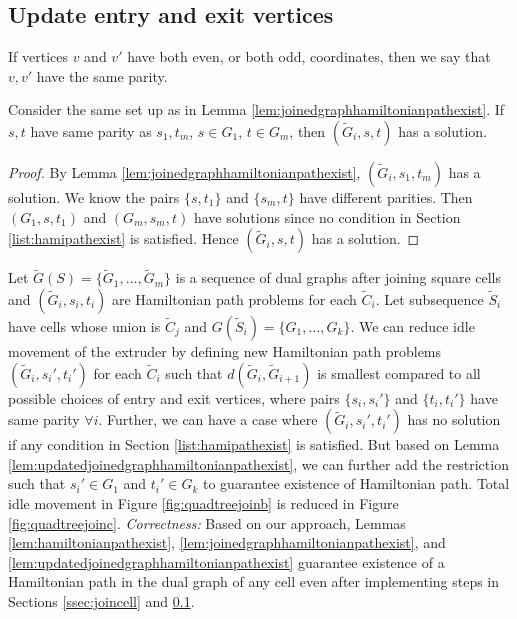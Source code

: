 \subsection{Update entry and exit vertices}\label{ssec:enterexitvertexupdate}

If vertices $v$ and $v'$ have both even, or both odd, coordinates, then we say that $v, v'$ have the same parity. 

\begin{lem}\label{lem:updatedjoinedgraphhamiltonianpathexist}
  Consider the same set up as in Lemma \ref{lem:joinedgraphhamiltonianpathexist}.
  If $s, t$ have same parity as $s_1, t_m$, $s \in G_1$, $t \in G_m$, then $(\tilde{G}_i, s, t)$ has a solution.
\end{lem}
\begin{proof}
  By Lemma \ref{lem:joinedgraphhamiltonianpathexist}, $(\tilde{G}_i, s_1, t_m)$ has a solution.
  We know the pairs $\{s, t_1\}$ and $\{s_m, t\}$ have different parities.
  Then $(G_1, s, t_1)$ and $(G_m, s_m, t)$ have solutions since no condition in Section \ref{list:hamipathexist} is satisfied.
  Hence $(\tilde{G}_i, s, t)$ has a solution.  
\end{proof}

Let $\tilde{G}(S) = \{\tilde{G}_1, \dots, \tilde{G}_m\}$ is a sequence of dual graphs after joining square cells and $(\tilde{G}_i, s_i, t_i)$ are Hamiltonian path problems for each $\tilde{C}_i$.
Let subsequence $\tilde{S}_i$ have cells whose union is $\tilde{C}_j$ and $G(\tilde{S}_i) = \{G_1, \dots, G_k\}$.
We can reduce idle movement of the extruder by defining new Hamiltonian path problems $(\tilde{G}_i, s_{i}', t_{i}')$ for each $\tilde{C}_i$ such that $d(\tilde{G}_i, \tilde{G}_{i+1})$ is smallest compared to all possible choices of entry and exit vertices, where pairs $\{s_{i}, s_{i}'\}$ and $\{t_{i}, t_{i}'\}$ have same parity $\forall i$.
Further, we can have a case where $(\tilde{G}_i, s_{i}', t_{i}')$ has no solution if any condition in Section \ref{list:hamipathexist} is satisfied.
But based on Lemma \ref{lem:updatedjoinedgraphhamiltonianpathexist}, we can further add the restriction such that $s_{i}' \in G_1$ and $t_{i}' \in G_k$ to guarantee existence of Hamiltonian path.
Total idle movement in Figure \ref{fig:quadtreejoinb} is reduced in Figure \ref{fig:quadtreejoinc}. 
\textit{Correctness:} Based on our approach, Lemmas \ref{lem:hamiltonianpathexist}, \ref{lem:joinedgraphhamiltonianpathexist}, and \ref{lem:updatedjoinedgraphhamiltonianpathexist} guarantee existence of a Hamiltonian path in the dual graph of any cell even after implementing steps in Sections \ref{ssec:joincell} and \ref{ssec:enterexitvertexupdate}.   

